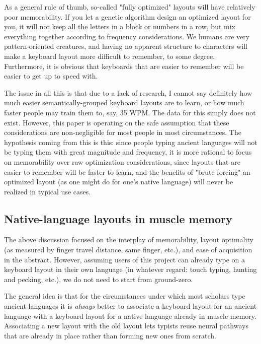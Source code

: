 \documentclass[11pt]{article}
\begin{document}
As a general rule of thumb, so-called "fully optimized" layouts will have relatively poor memorability. If you let a genetic algorithm design an optimized layout for you, it will not keep all the letters in a block or numbers in a row, but mix everything together according to frequency considerations. We humans are very pattern-oriented creatures, and having no apparent structure to characters will make a keyboard layout more difficult to remember, to some degree. Furthermore, it is obvious that keyboards that are easier to remember will be easier to get up to speed with.

The issue in all this is that due to a lack of research, I cannot say definitely how much easier semantically-grouped keyboard layouts are to learn, or how much faster people may train them to, say, 35 WPM. The data for this simply does not exist. However, this paper is operating on the safe assumption that these considerations are non-negligible for most people in most circumstances. The hypothesis coming from this is this: since people typing ancient languages will not be typing them with great magnitude and frequency, it is more rational to focus on memorability over raw optimization considerations, since layouts that are easier to remember will be faster to learn, and the benefits of "brute forcing" an optimized layout (as one might do for one's native language) will never be realized in typical use cases.

\subsection{Native-language layouts in muscle memory}
\label{sec:org9ce4be4}

The above discussion focused on the interplay of memorability, layout optimality (as measured by finger travel distance, same finger, etc.), and ease of acquisition in the abstract. However, assuming users of this project can already type on a keyboard layout in their own language (in whatever regard: touch typing, hunting and pecking, etc.), we do not need to start from ground-zero.

The general idea is that for the circumstances under which most scholars type ancient languages it is \emph{always} better to associate a keyboard layout for an ancient language with a keyboard layout for a native language already in muscle memory. Associating a new layout with the old layout lets typists reuse neural pathways that are already in place rather than forming new ones from scratch.
\end{document}
